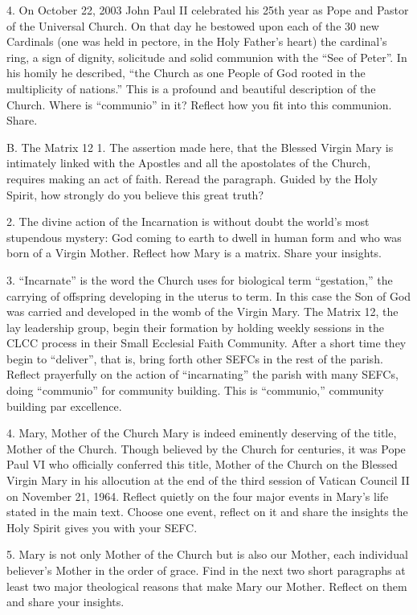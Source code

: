 \documentclass[oneside]{book}
\begin{document}
4. On October 22, 2003 John Paul II celebrated his 25th year as Pope and Pastor
of the Universal Church. On that day he bestowed upon each of the 30 new
Cardinals (one was held in pectore, in the Holy Father's heart) the cardinal's
ring, a sign of dignity, solicitude and solid communion with the ``See of
Peter''. In his homily he described, ``the Church as one People of God rooted in
the multiplicity of nations.'' This is a profound and beautiful description of
the Church. Where is ``communio'' in it? Reflect how you fit into this
communion. Share.

B. The Matrix 12
1. The assertion made here, that the Blessed Virgin Mary is intimately linked
with the Apostles and all the apostolates of the Church, requires making an act
of faith. Reread the paragraph. Guided by the Holy Spirit, how strongly do you
believe this great truth?

2. The divine action of the Incarnation is without doubt the world's most
stupendous mystery: God coming to earth to dwell in human form and who was born
of a Virgin Mother. Reflect how Mary is a matrix. Share your insights.

3. ``Incarnate'' is the word the Church uses for biological term ``gestation,''
the carrying of offspring developing in the uterus to term. In this case the Son
of God was carried and developed in the womb of the Virgin Mary. The Matrix 12,
the lay leadership group, begin their formation by holding weekly sessions in
the CLCC process in their Small Ecclesial Faith Community. After a short time
they begin to ``deliver'', that is, bring forth other SEFCs in the rest of the
parish. Reflect prayerfully on the action of ``incarnating'' the parish with
many SEFCs, doing ``communio'' for community building. This is ``communio,''
community building par excellence.

4. Mary, Mother of the Church
Mary is indeed eminently deserving of the title, Mother of the Church. Though
believed by the Church for centuries, it was Pope Paul VI who officially
conferred this title, Mother of the Church on the Blessed Virgin Mary in his
allocution at the end of the third session of Vatican Council II on November 21,
1964. Reflect quietly on the four major events in Mary's life stated in the main
text. Choose one event, reflect on it and share the insights the Holy Spirit
gives you with your SEFC.

5. Mary is not only Mother of the Church but is also our Mother, each individual
believer's Mother in the order of grace. Find in the next two short paragraphs
at least two major theological reasons that make Mary our Mother. Reflect on
them and share your insights.
\end{document}
